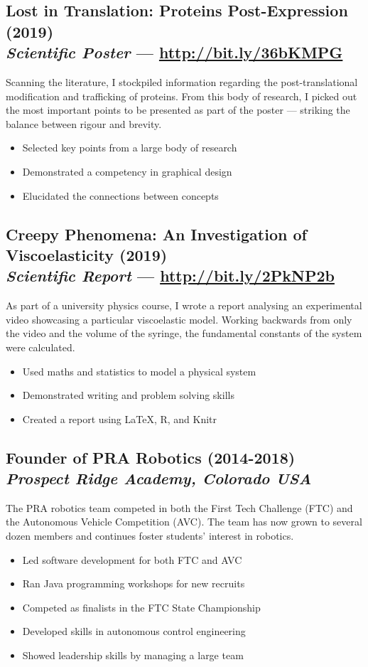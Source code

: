 \documentclass[twocolumn, a4paper, fontsize=9pt, headsepline, footsepline]{scrartcl}
\begin{document}
\subsection*{Lost in Translation: Proteins Post-Expression (2019)\\\textmd{\emph{Scientific Poster} — \url{http://bit.ly/36bKMPG}}}
\noindent
Scanning the literature, I stockpiled information regarding the
post-translational modification and trafficking of proteins. From this body of
research, I picked out the most important points to be presented as part of the
poster — striking the balance between rigour and brevity.
\begin{itemize}
\item Selected key points from a large body of research
\item Demonstrated a competency in graphical design
\item Elucidated the connections between concepts 
\end{itemize}

\subsection*{Creepy Phenomena: An Investigation of Viscoelasticity
  (2019)\\\textmd{\emph{Scientific Report} — \url{http://bit.ly/2PkNP2b}}}
\noindent
As part of a university physics course, I wrote a report analysing an
experimental video showcasing a particular viscoelastic model. Working backwards
from only the video and the volume of the syringe, the fundamental constants of
the system were calculated.\par
\begin{itemize}
\item Used maths and statistics to model a physical system
\item Demonstrated writing and problem solving skills
\item Created a report using LaTeX, R, and Knitr
\end{itemize}

\subsection*{Founder of PRA Robotics (2014-2018)\\\textmd{\emph{Prospect Ridge
    Academy, Colorado USA}}}
\noindent
The PRA robotics team competed in both the First Tech Challenge (FTC) and the
Autonomous Vehicle Competition (AVC). The team has now grown to several dozen
members and continues foster students' interest in robotics.
\begin{itemize}
\item Led software development for both FTC and AVC
\item Ran Java programming workshops for new recruits
\item Competed as finalists in the FTC State Championship
\item Developed skills in autonomous control engineering
\item Showed leadership skills by managing a large team
\end{itemize}
\end{document}
